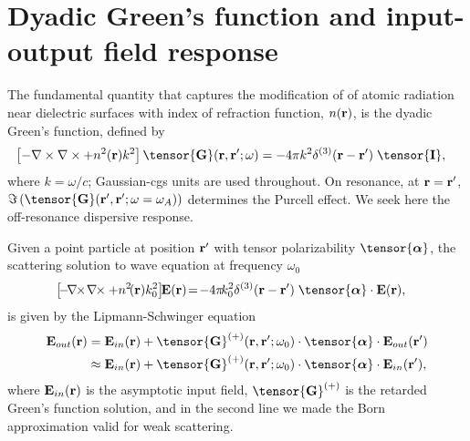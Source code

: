 \documentclass[preprint,aps,pra,onecolumn]{revtex4-1} %
\begin{document}
\section{Dyadic Green's function and input-output field response}
The fundamental quantity that captures the modification of of atomic radiation near dielectric surfaces 
with index of refraction function, $n(\mathbf{r})$, is the dyadic Green's function, defined by
 \begin{align}
\left[ -\nabla\times\nabla\times + n^2(\mbf{r}) k^2 \right] \tensor{\mathbf{G}}(\br, \br';\omega) &= -4 \pi 
k^2 \delta^{(3)}(\mathbf{r}-\mathbf{r}')\;\tensor{\mathbf{I}},
\end{align}
where $k=\omega/c$; Gaussian-cgs units are used throughout.  On resonance, at $\mathbf{r}=\mathbf{r}'$, 
$\Im\left(\tensor{\mathbf{G}}(\br', \br'; \omega= \omega_A) \right)$ determines the Purcell effect.  We 
seek here the off-resonance dispersive response.

Given a point particle at position $\mathbf{r}'$ with tensor polarizability $\tensor{\boldsymbol{\alpha}}$, the  
scattering solution to wave equation at frequency $\omega_0$
\begin{align}\label{eq:Maxwellwithsource2}
\left[\! -\! \nabla\!\!\times\!\nabla\!\!\times + n^2\!(\br)k_0^2 \right]\!\! \mathbf{E}(\br) &\!=\! -4\pi\! k_0^2 
\delta^{(3)}(\br-\br')\;  \tensor{\boldsymbol{\alpha}}\cdot \mathbf{E}(\br),
\end{align}
is given by the Lipmann-Schwinger equation
\begin{align}
\mathbf{E}_{out}(\br) &=\mathbf{E}_{in}(\br)+\tensor{\mathbf{G}}^{(+)}(\br , \br'; \omega_0)\cdot 
\tensor{\boldsymbol{\alpha}}\cdot \mathbf{E}_{out}(\br')\\
&\approx \mathbf{E}_{in}(\br)+ \tensor{\mathbf{G}}^{(+)}(\br , \br'; \omega_0) \cdot 
\tensor{\boldsymbol{\alpha}}\cdot \mathbf{E}_{in}(\br'),
\end{align}
where $\mathbf{E}_{in}(\mathbf{r})$ is the asymptotic input field, $\tensor{\mathbf{G}}^{(+)}$ is the retarded 
Green's function solution, and in the second line we made the Born approximation valid for weak 
scattering.  
\end{document}
